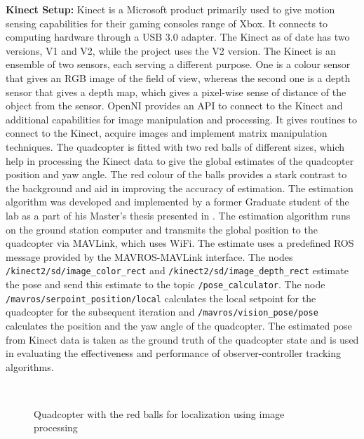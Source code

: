 \documentclass[letterpaper%
, twoside%
, 12pt%
,memoire%
, english%
,creativecommons,hyperref%
]{thETS}
\begin{document}


\textbf{Kinect Setup:} Kinect is a Microsoft product primarily used to give motion sensing capabilities for their gaming consoles range of Xbox. It connects to computing hardware through a USB 3.0 adapter. The Kinect as of date has two versions, V1 and V2, while the project uses the V2 version. The Kinect is an ensemble of two sensors, each serving a different purpose. One is a colour sensor that gives an RGB image of the field of view, whereas the second one is a depth sensor that gives a depth map, which gives a pixel-wise sense of distance of the object from the sensor. OpenNI provides an API to connect to the Kinect and additional capabilities for image manipulation and processing. It gives routines to connect to the Kinect, acquire images and implement matrix manipulation techniques. The quadcopter is fitted with two red balls of different sizes, which help in processing the Kinect data to give the global estimates of the quadcopter position and yaw angle. The red colour of the balls provides a stark contrast to the background and aid in improving the accuracy of estimation.
The estimation algorithm was developed and implemented by a former Graduate student of the lab as a part of his Master's thesis presented in \citep{brice2017thesis}. The estimation algorithm runs on the ground station computer and transmits the global position to the quadcopter via MAVLink, which uses WiFi. The estimate uses a predefined ROS message provided by the MAVROS-MAVLink interface. The nodes \texttt{/kinect2/sd/image\_color\_rect} and \texttt{/kinect2/sd/image\_depth\_rect} estimate the pose and send this estimate to the topic \texttt{/pose\_calculator}. The node \texttt{/mavros/serpoint\_position/local} calculates the local setpoint for the quadcopter for the subsequent iteration and \texttt{/mavros/vision\_pose/pose} calculates the position and the yaw angle of the quadcopter. The estimated pose from Kinect data is taken as the ground truth of the quadcopter state and is used in evaluating the effectiveness and performance of observer-controller tracking algorithms.

\begin{figure}
	\centering
	 \\ \parbox{0.75\textwidth}{\caption{Quadcopter with the red balls for localization using image processing\label{Fig:quad_red_balls}}}
\end{figure}
\end{document}
